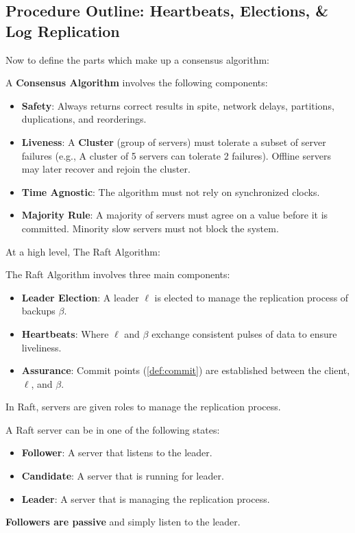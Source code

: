 \subsection{Procedure Outline: Heartbeats, Elections, \& Log Replication}
\noindent
Now to define the parts which make up a consensus algorithm:
\begin{Def}

    A \textbf{Consensus Algorithm} involves the following components:
    \begin{itemize}
        \item \textbf{Safety}: Always returns correct results in spite, network delays, partitions, duplications, and reorderings.
        \item \textbf{Liveness}: A \textbf{Cluster} (group of servers) must tolerate a subset of server failures (e.g., A cluster of 5 servers can tolerate 2 failures). Offline 
        servers may later recover and rejoin the cluster.
        \item \textbf{Time Agnostic}: The algorithm must not rely on synchronized clocks.
        \item \textbf{Majority Rule}: A majority of servers must agree on a value before it is committed. Minority slow servers must not block the system.
    \end{itemize}
\end{Def}

\noindent
At a high level, The Raft Algorithm:
\begin{Def}

    The Raft Algorithm involves three main components:
    \begin{itemize}
        \item \textbf{Leader Election}: A leader $\ell$ is elected to manage the replication process of backups $\beta$.
        \item \textbf{Heartbeats}: Where $\ell$ and $\beta$ exchange consistent pulses of data to ensure liveliness.
        \item \textbf{Assurance}: Commit points (\ref{def:commit}) are established between the client, $\ell$, and $\beta$. 
    \end{itemize}
\end{Def}
\noindent
In Raft, servers are given roles to manage the replication process.
\begin{Def}

    A Raft server can be in one of the following states:
    \begin{itemize}
        \item \textbf{Follower}: A server that listens to the leader.
        \item \textbf{Candidate}: A server that is running for leader.
        \item \textbf{Leader}: A server that is managing the replication process.
    \end{itemize}
    \textbf{Followers are passive} and simply listen to the leader.
\end{Def}

